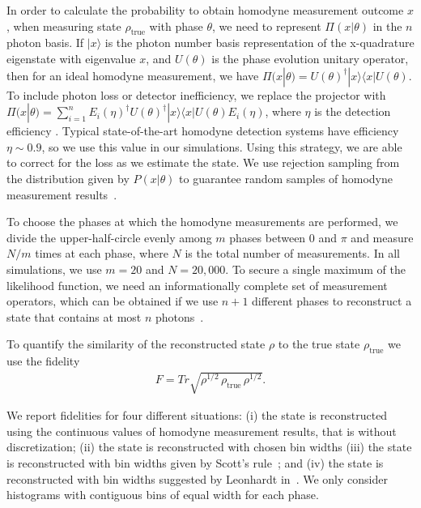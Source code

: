 \documentclass[
reprint,
superscriptaddress,
showpacs,
amsmath,
amssymb,
aps,
pra,
longbibliography
]{revtex4-1}
\newcommand{\rhotrue}{\rho_{\text{true}}}
\begin{document}
In order to calculate the probability to obtain homodyne measurement
outcome $x$, when measuring state $\rho_{\mathrm{true}}$ with phase
$\theta$, we need to represent $\Pi (x|\theta)$ in the $n$ photon
basis. If $|x\rangle$ is the photon number basis
representation of the x-quadrature eigenstate with eigenvalue $x$, and
$U(\theta)$ is the phase evolution unitary operator, then for an ideal
homodyne measurement, we have
$\Pi (x|\theta) = U(\theta)^{\dagger}|x\rangle \langle x|
U(\theta)$. To include photon loss or detector inefficiency, we replace 
the projector with $\Pi (x|\theta) = \sum_{i=1}^{n} E_i(\eta)^{\dagger}
U(\theta)^{\dagger}|x\rangle \langle x| U(\theta) E_i(\eta)$, where
$\eta$ is the detection efficiency \cite{Lvovsky2004}.
Typical state-of-the-art homodyne detection systems have efficiency 
$\eta \sim 0.9$, so we use this value in our simulations. Using this strategy, 
we are able to correct for the loss as we estimate the state. We use rejection
sampling from the distribution given by $P(x|\theta)$ to guarantee
random samples of homodyne measurement results~\cite{Kennedy1980}.

To choose the phases at which the homodyne measurements are performed,
we divide the upper-half-circle evenly among $m$ phases between 0 and
$\pi$ and measure $N/m$ times at each phase, where $N$ is the total
number of measurements. In all simulations, we use $m=20$ and
$N = 20,000$. To secure a single maximum of the likelihood function,
we need an informationally complete set of measurement operators,
which can be obtained if we use $n+1$ different phases to reconstruct
a state that contains at most $n$ photons~\cite{Leonhardt1997}.

To quantify the similarity of the reconstructed state $\rho$ to the 
true state $\rhotrue$ we use the fidelity
\begin{eqnarray}
  F = Tr \sqrt{\rho^{1/2}\, \rhotrue \, \rho^{1/2}}.
\end{eqnarray}

We report fidelities for four different situations: 
(i) the state is reconstructed using the continuous values of homodyne measurement results, that is without discretization; (ii) the state is reconstructed 
with chosen bin widths (iii) the state is reconstructed with bin widths given by
Scott's rule~\cite{Scott2010}; and (iv) the state is reconstructed
with bin widths suggested by Leonhardt in~\cite{Leonhardt1997}. We  
only consider histograms with contiguous bins of equal width for each phase.
\end{document}
